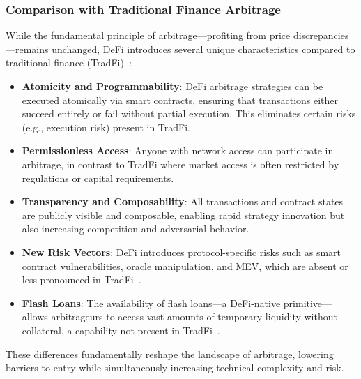\documentclass[conference]{IEEEtran}
\begin{document}
\subsubsection{Comparison with Traditional Finance Arbitrage}
While the fundamental principle of arbitrage—profiting from price discrepancies—remains unchanged, DeFi introduces several unique characteristics compared to traditional finance (TradFi)~\cite{werner2021sok}:
\begin{itemize}
    \item \textbf{Atomicity and Programmability}: DeFi arbitrage strategies can be executed atomically via smart contracts, ensuring that transactions either succeed entirely or fail without partial execution. This eliminates certain risks (e.g., execution risk) present in TradFi.
    \item \textbf{Permissionless Access}: Anyone with network access can participate in arbitrage, in contrast to TradFi where market access is often restricted by regulations or capital requirements.
    \item \textbf{Transparency and Composability}: All transactions and contract states are publicly visible and composable, enabling rapid strategy innovation but also increasing competition and adversarial behavior.
    \item \textbf{New Risk Vectors}: DeFi introduces protocol-specific risks such as smart contract vulnerabilities, oracle manipulation, and MEV, which are absent or less pronounced in TradFi~\cite{daian2020flash}.
    \item \textbf{Flash Loans}: The availability of flash loans—a DeFi-native primitive—allows arbitrageurs to access vast amounts of temporary liquidity without collateral, a capability not present in TradFi~\cite{qin2021attacking}.
\end{itemize}
These differences fundamentally reshape the landscape of arbitrage, lowering barriers to entry while simultaneously increasing technical complexity and risk.
\end{document}
